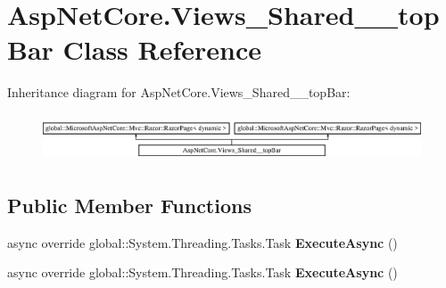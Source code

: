 \hypertarget{class_asp_net_core_1_1_views___shared____top_bar}{}\section{Asp\+Net\+Core.\+Views\+\_\+\+Shared\+\_\+\+\_\+top\+Bar Class Reference}
\label{class_asp_net_core_1_1_views___shared____top_bar}
Inheritance diagram for Asp\+Net\+Core.\+Views\+\_\+\+Shared\+\_\+\+\_\+top\+Bar\+:\begin{figure}[H]
\begin{center}
\leavevmode
\includegraphics[height=1.432225cm]{class_asp_net_core_1_1_views___shared____top_bar}
\end{center}
\end{figure}
\subsection*{Public Member Functions}
\begin{DoxyCompactItemize}
\item 
\mbox{\label{class_asp_net_core_1_1_views___shared____top_bar_a0f6a4cc825e8ea69045cf36b51694898}} 
async override global\+::\+System.\+Threading.\+Tasks.\+Task {\bfseries Execute\+Async} ()
\item 
\mbox{\label{class_asp_net_core_1_1_views___shared____top_bar_a0f6a4cc825e8ea69045cf36b51694898}} 
async override global\+::\+System.\+Threading.\+Tasks.\+Task {\bfseries Execute\+Async} ()
\end{DoxyCompactItemize}
